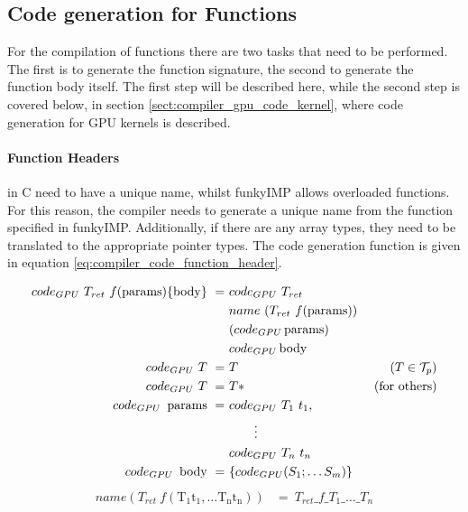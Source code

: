 \subsection{Code generation for Functions}
\label{sect:compiler_gpu_functions}

For the compilation of functions there are two tasks that need to be performed. The first is to generate the function signature, the second to generate the function body itself. The first step will be described here, while the second step is covered below, in section \ref{sect:compiler_gpu_code_kernel}, where code generation for GPU kernels is described.

\paragraph{Function Headers} in C need to have a unique name, whilst funkyIMP allows overloaded functions. For this reason, the compiler needs to generate a unique name from the function specified in funkyIMP. Additionally, if there are any array types, they need to be translated to the appropriate pointer types. The code generation function is given in equation \ref{eq:compiler_code_function_header}.

\begin{align}
	\label{eq:compiler_code_function_header}
	code_{GPU}\ T_{ret}\ f(\operatorname{params})
		\{ \operatorname{body} \}\ = 	&\ code_{GPU}\ T_{ret} &\ \\
									 	&\ name \ (T_{ret}\ f(\operatorname{params})) &\ \notag \\
										&\ (code_{GPU} \operatorname{params}) &\ \notag\\
										&\ code_{GPU} \operatorname{body} &\ \notag\\
	code_{GPU}\ T\ = 					&\ T &\ (T\in\mathcal{T}_p) \notag \\
	code_{GPU}\ T\ =					&\ T * &\ (\text{for others}) \notag \\
	code_{GPU}\ \operatorname{params}\ =&\ code_{GPU}\ T_1\ t_1, &\ \notag\\
										&\ \qquad\vdots &\ \notag\\
										&\ code_{GPU}\ T_n\ t_n &\ \notag\\
	code_{GPU}\ \operatorname{body}\ =  &\ \{code_{GPU} (S_1;\dotsc S_m)\} \notag
\end{align}
\begin{align*}
	name (T_{ret}\ f(\operatorname{T_1 t_1, \dotsc T_n t_n})) &=\ T_{ret}\_f\_T_1\_\dotsc\_T_n
\end{align*}


